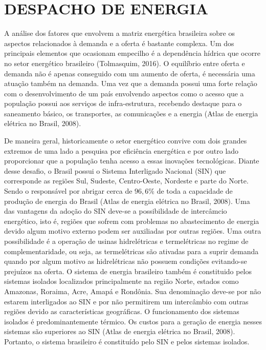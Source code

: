 \documentclass[12pt,fleqn]{article}
\begin{document}
\section{DESPACHO DE ENERGIA}
A an\'alise dos fatores que envolvem a matriz energ\'etica brasileira sobre os aspectos relacionados \`a demanda e a
oferta \'e bastante
complexa. Um dos principais elementos que ocasionam empecilho \'e a depend\^encia h\'idrica que ocorre no setor energ\'etico brasileiro (Tolmasquim, 2016). O equil\'ibrio entre oferta e demanda n\~ao \'e apenas conseguido com um aumento de oferta,
\'e necess\'aria uma atua\c c\~ao tamb\'em na demanda. Uma vez que a demanda possui uma forte rela\c c\~ao com o
desenvolvimento de um pa\'is envolvendo aspectos como o acesso que a popula\c c\~ao possui aos servi\c cos de
infra-estrutura,
recebendo destaque para o saneamento b\'asico, os transportes, as comunica\c c\~oes e a energia (Atlas de
energia el\'etrica no Brasil, 2008). 

De maneira geral, historicamente o setor energ\'etico convive com dois grandes extremos de uma lado a
pesquisa por efici\^encia energ\'etica e por outro lado proporcionar que a popula\c c\~ao tenha acesso  a essas inova\c
c\~oes tecnol\'ogicas. Diante desse desafio, o Brasil possui o Sistema Interligado Nacional (SIN) que corresponde as
regi\~oes Sul, Sudeste, Centro-Oeste, Nordeste e parte do Norte. Sendo o respons\'avel por abrigar cerca de $96,6\%$ de toda a capacidade de produ\c c\~ao de energia do Brasil (Atlas de
energia el\'etrica no Brasil, 2008). Uma das vantagens da ado\c c\~ao do SIN deve-se a possibilidade de interc\^amcio
energ\'etico, isto \'e, regi\~oes que sofrem com problemas no abastecimento  de energia devido algum motivo externo
podem ser auxiliadas por outras regi\~oes. Uma outra possibilidade \'e a opera\c c\~ao de usinas hidrel\'etricas e termel\'etricas no
regime de complementaridade, ou seja, as termel\'etricas s\~ao ativadas para a suprir demanda quando por algum motivo as
hidrel\'etricas n\~ao possuem condi\c c\~oes evitando-se preju\'izos na oferta. O sistema de energia brasileiro tamb\'em \'e constituido pelos sistemas isolados localizados principalmente na regi\~ao Norte,
estados como Amazonas, Roraima, Acre, Amap\'a e Rond\^onia. Sua denomina\c c\~ao deve-se por n\~ao estarem interligados ao
SIN e por n\~ao permitirem um interc\^ambio com outras regi\~oes devido as caracter\'isticas geogr\'aficas. O
funcionamento dos
sistemas isolados \'e predominantemente t\'ermico. Os custos para a gera\c c\~ao de energia nesses sistemas s\~ao
superiores ao SIN (Atlas de
energia el\'etrica no Brasil, 2008). Portanto, o sistema brasileiro \'e constitu\'ido pelo SIN e pelos sistemas isolados. 
\end{document}
